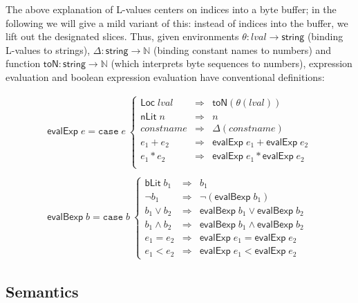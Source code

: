 \documentclass[svgnames]{llncs}
\newcommand{\konst}[1]{\ensuremath{\mathsf{#1}}}
\newcommand{\lval}{\ensuremath{\mathit{lval}}}
\begin{document}
The above explanation of L-values centers on indices into a byte
buffer; in the following we will give a mild variant of this: instead
of indices into the buffer, we lift out the designated slices. Thus, given
environments $\theta: \mathit{lval} \to \konst{string}$ (binding
L-values to strings), $\Delta : \konst{string} \to \mathbb{N}$
(binding constant names to numbers) and function
$\konst{toN}:\konst{string}\to\mathbb{N}$ (which interprets byte
sequences to numbers), expression evaluation and boolean expression
evaluation have conventional definitions:

\[
\begin{array}{l}
\konst{evalExp} \; e =
\mathtt{case}\; e\
 \left\{
 \begin{array}{lcl}
    \konst{Loc}\; \lval & \Rightarrow & \konst{toN}(\theta(\lval)) \\
    \konst{nLit}\; n & \Rightarrow & n  \\
    \mathit{constname} & \Rightarrow & \Delta(\mathit{constname})  \\
    e_1 + e_2 & \Rightarrow & \konst{evalExp}\; e_1 + \konst{evalExp}\; e_2  \\
    e_1 * e_2 & \Rightarrow & \konst{evalExp}\; e_1 * \konst{evalExp}\; e_2  \\
  \end{array}
 \right.
 \\ \\
\konst{evalBexp} \; b =
\mathtt{case}\; b\
 \left\{
 \begin{array}{lcl}
    \konst{bLit}\; b_1 & \Rightarrow & b_1 \\
    \neg b_1 & \Rightarrow & \neg(\konst{evalBexp} \; b_1)  \\
    b_1 \lor b_2 & \Rightarrow & \konst{evalBexp} \;b_1 \lor \konst{evalBexp} \;b_2   \\
    b_1 \land b_2 & \Rightarrow & \konst{evalBexp} \;b_1 \land \konst{evalBexp} \;b_2   \\
    e_1 = e_2 & \Rightarrow & \konst{evalExp} \;e_1 = \konst{evalExp} \;e_2   \\
    e_1 < e_2 & \Rightarrow & \konst{evalExp} \;e_1 < \konst{evalExp} \;e_2
  \end{array}
 \right.

\end{array}
\]



\subsection{Semantics}
\end{document}
